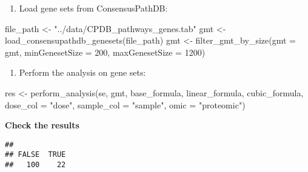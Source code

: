 \documentclass[
]{article}
\newenvironment{Shaded}{\begin{snugshade}}{\end{snugshade}}
\newcommand{\AttributeTok}[1]{\textcolor[rgb]{0.77,0.63,0.00}{#1}}
\newcommand{\DecValTok}[1]{\textcolor[rgb]{0.00,0.00,0.81}{#1}}
\newcommand{\FloatTok}[1]{\textcolor[rgb]{0.00,0.00,0.81}{#1}}
\newcommand{\FunctionTok}[1]{\textcolor[rgb]{0.00,0.00,0.00}{#1}}
\newcommand{\NormalTok}[1]{#1}
\newcommand{\OtherTok}[1]{\textcolor[rgb]{0.56,0.35,0.01}{#1}}
\newcommand{\SpecialCharTok}[1]{\textcolor[rgb]{0.00,0.00,0.00}{#1}}
\newcommand{\StringTok}[1]{\textcolor[rgb]{0.31,0.60,0.02}{#1}}
\providecommand{\tightlist}{%
  \setlength{\itemsep}{0pt}\setlength{\parskip}{0pt}}
\begin{document}
\begin{enumerate}
\def\labelenumi{\arabic{enumi}.}
\setcounter{enumi}{3}
\tightlist
\item
  Load gene sets from ConsensusPathDB:
\end{enumerate}

\begin{Shaded}
\begin{Highlighting}[]
\NormalTok{file\_path }\OtherTok{\textless{}{-}} \StringTok{"../data/CPDB\_pathways\_genes.tab"}
\NormalTok{gmt }\OtherTok{\textless{}{-}} \FunctionTok{load\_consensupathdb\_genesets}\NormalTok{(file\_path)}
\NormalTok{gmt }\OtherTok{\textless{}{-}} \FunctionTok{filter\_gmt\_by\_size}\NormalTok{(}\AttributeTok{gmt =}\NormalTok{ gmt, }\AttributeTok{minGenesetSize =} \DecValTok{200}\NormalTok{, }\AttributeTok{maxGenesetSize =} \DecValTok{1200}\NormalTok{)}
\end{Highlighting}
\end{Shaded}

\begin{enumerate}
\def\labelenumi{\arabic{enumi}.}
\setcounter{enumi}{4}
\tightlist
\item
  Perform the analysis on gene sets:
\end{enumerate}

\begin{Shaded}
\begin{Highlighting}[]
\NormalTok{res }\OtherTok{\textless{}{-}} \FunctionTok{perform\_analysis}\NormalTok{(se, gmt, base\_formula, linear\_formula, cubic\_formula, }\AttributeTok{dose\_col =} \StringTok{"dose"}\NormalTok{, }\AttributeTok{sample\_col =} \StringTok{"sample"}\NormalTok{, }\AttributeTok{omic =} \StringTok{"proteomic"}\NormalTok{)}
\end{Highlighting}
\end{Shaded}

\textbf{Check the results}

\begin{Shaded}
\end{Shaded}

\begin{verbatim}
## 
## FALSE  TRUE 
##   100    22
\end{verbatim}

\begin{Shaded}
\end{Shaded}
\end{document}
